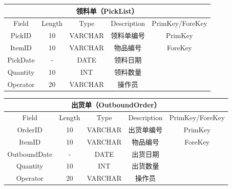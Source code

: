 \documentclass[12pt,a4paper]{article}
\begin{document}
\begin{table}[h]
    \centering
    \begin{tabular}{|c|c|c|c|c|} 
     \hline
     \multicolumn{5}{|c|}{领料单（PickList）}\\
        \hline
            Field       & Length & Type    & Description      & PrimKey/ForeKey \\ \hline
            PickID      & 10     & VARCHAR & 领料单编号        & PrimKey         \\ \hline
            ItemID      & 10     & VARCHAR & 物品编号          & ForeKey         \\ \hline
            PickDate    & -      & DATE    & 领料日期          &                 \\ \hline
            Quantity    & 10     & INT     & 领料数量          &                 \\ \hline
            Operator    & 20     & VARCHAR & 操作员            &                 \\ \hline
            \end{tabular}
    \label{table:4}
\end{table}

\begin{table}[h]
    \centering
    \begin{tabular}{|c|c|c|c|c|} 
     \hline
     \multicolumn{5}{|c|}{出货单（OutboundOrder）}\\
        \hline
            Field       & Length & Type    & Description      & PrimKey/ForeKey \\ \hline
            OrderID     & 10     & VARCHAR & 出货单编号        & PrimKey \\ \hline
            ItemID & 10 & VARCHAR & 物品编号 & ForeKey \\ \hline
            OutboundDate& - & DATE & 出货日期 & \\ \hline
            Quantity & 10 & INT & 出货数量 & \\ \hline
            Operator & 20 & VARCHAR & 操作员 & \\ \hline
            \end{tabular}
    \label{table:5}
\end{table}
\end{document}
